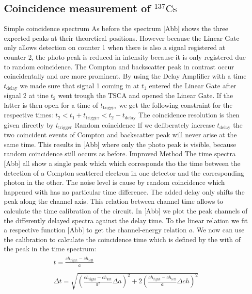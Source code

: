 \subsection{Coincidence measurement of $^{137}\text{Cs}$}
%
Simple coincidence spectrum
%
As before the spectrum [Abb] shows the three expected peaks at their theoretical positions. However because the Linear Gate only allows detection on counter 1 when there is also a signal registered at counter 2, the photo peak is reduced in intensity because it is only registered due to random coincidence. The Compton and backscatter peak in contrast occur coincidentally and are more prominent.
By using the Delay Amplifier with a time $t_{\text{delay}}$ we made sure that signal 1 coming in at $t_1$ entered the Linear Gate after signal 2 at tine $t_2$ went trough the TSCA and opened the Linear Gate. If the latter is then open for a time of $t_{\text{trigger}}$ we get the following constraint for the respective times:
$t_2 < t_1 + t_{\text{trigger}} < t_2 +  t_{\text{delay}}$
The coincidence resolution is then given directly by $t_{\text{trigger}}$
%
Random coincidence
%
If we deliberately increase $t_{\text{delay}}$ the two coincident events of Compton and backscatter peak will never arise at the same time. This results in [Abb] where only the photo peak is visible, because  random coincidence still occurs as before.
%
Improved Method
%
The time spectra [Abb] all show a single peak which which corresponds tho the time between the detection of a Compton scattered electron in one detector and the corresponding photon in the other.
The noise level is cause by random coincidence which happened with has no particular time difference.
The added delay only shifts the peak along the channel axis. This relation between channel time allows to calculate the time calibration of the circuit.
In [Abb] we plot the peak channels of the differently delayed spectra against the delay time. To the linear relation we fit a respective function [Abb] to get the channel-energy relation $a$.
We now can use the calibration to calculate the coincidence time which is defined by the with of the peak in the time spectrum:
%
\begin{align}
    \label{eq:}
    \begin{split}
        t = \frac{ch_{\text{right}}-ch_{\text{left}}}{a}
    \end{split}
    \\
    \label{eq:}
    \begin{split}
        \Delta t = \sqrt{ \left (  \frac{ch_{\text{right}}-ch_{\text{left}}}{a^2} \Delta a \right)^2 + 2 \left ( \frac{ch_{\text{right}}-ch_{\text{left}}}{a} \Delta ch \right)^2 }
    \end{split}
\end{align}
